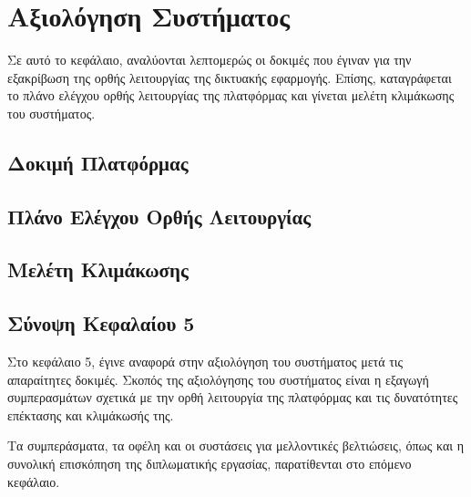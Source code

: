 \chapter{Αξιολόγηση Συστήματος}
Σε αυτό το κεφάλαιο, αναλύονται λεπτομερώς οι δοκιμές που έγιναν για την εξακρίβωση της ορθής λειτουργίας της δικτυακής εφαρμογής. Επίσης, καταγράφεται το πλάνο ελέγχου ορθής λειτουργίας της πλατφόρμας και γίνεται μελέτη κλιμάκωσης του συστήματος.

\section{Δοκιμή Πλατφόρμας}


\section{Πλάνο Ελέγχου Ορθής Λειτουργίας}


\section{Μελέτη Κλιμάκωσης}


\section{Σύνοψη Κεφαλαίου 5}
Στο κεφάλαιο 5, έγινε αναφορά στην αξιολόγηση του συστήματος μετά τις απαραίτητες δοκιμές. Σκοπός της αξιολόγησης του συστήματος είναι η εξαγωγή συμπερασμάτων σχετικά με την ορθή λειτουργία της πλατφόρμας και τις δυνατότητες επέκτασης και κλιμάκωσής της.

Τα συμπεράσματα, τα οφέλη και οι συστάσεις για μελλοντικές βελτιώσεις, όπως και η συνολική επισκόπηση της διπλωματικής εργασίας, παρατίθενται στο επόμενο κεφάλαιο.
